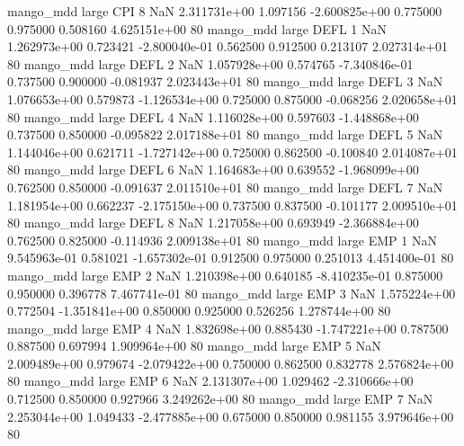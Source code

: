         mango_mdd      large      CPI                 8                  NaN 2.311731e+00      1.097156 -2.600825e+00 0.775000 0.975000       0.508160 4.625151e+00 80
        mango_mdd      large     DEFL                 1                  NaN 1.262973e+00      0.723421 -2.800040e-01 0.562500 0.912500       0.213107 2.027314e+01 80
        mango_mdd      large     DEFL                 2                  NaN 1.057928e+00      0.574765 -7.340846e-01 0.737500 0.900000      -0.081937 2.023443e+01 80
        mango_mdd      large     DEFL                 3                  NaN 1.076653e+00      0.579873 -1.126534e+00 0.725000 0.875000      -0.068256 2.020658e+01 80
        mango_mdd      large     DEFL                 4                  NaN 1.116028e+00      0.597603 -1.448868e+00 0.737500 0.850000      -0.095822 2.017188e+01 80
        mango_mdd      large     DEFL                 5                  NaN 1.144046e+00      0.621711 -1.727142e+00 0.725000 0.862500      -0.100840 2.014087e+01 80
        mango_mdd      large     DEFL                 6                  NaN 1.164683e+00      0.639552 -1.968099e+00 0.762500 0.850000      -0.091637 2.011510e+01 80
        mango_mdd      large     DEFL                 7                  NaN 1.181954e+00      0.662237 -2.175150e+00 0.737500 0.837500      -0.101177 2.009510e+01 80
        mango_mdd      large     DEFL                 8                  NaN 1.217058e+00      0.693949 -2.366884e+00 0.762500 0.825000      -0.114936 2.009138e+01 80
        mango_mdd      large      EMP                 1                  NaN 9.545963e-01      0.581021 -1.657302e-01 0.912500 0.975000       0.251013 4.451400e-01 80
        mango_mdd      large      EMP                 2                  NaN 1.210398e+00      0.640185 -8.410235e-01 0.875000 0.950000       0.396778 7.467741e-01 80
        mango_mdd      large      EMP                 3                  NaN 1.575224e+00      0.772504 -1.351841e+00 0.850000 0.925000       0.526256 1.278744e+00 80
        mango_mdd      large      EMP                 4                  NaN 1.832698e+00      0.885430 -1.747221e+00 0.787500 0.887500       0.697994 1.909964e+00 80
        mango_mdd      large      EMP                 5                  NaN 2.009489e+00      0.979674 -2.079422e+00 0.750000 0.862500       0.832778 2.576824e+00 80
        mango_mdd      large      EMP                 6                  NaN 2.131307e+00      1.029462 -2.310666e+00 0.712500 0.850000       0.927966 3.249262e+00 80
        mango_mdd      large      EMP                 7                  NaN 2.253044e+00      1.049433 -2.477885e+00 0.675000 0.850000       0.981155 3.979646e+00 80
